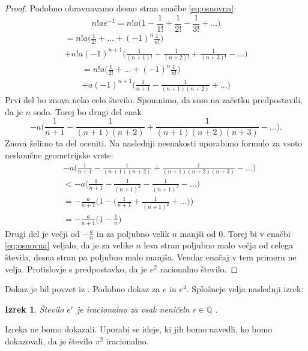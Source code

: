 \documentclass[a4paper]{article}
\makeatletter
\theoremstyle{plain}
\newtheorem{izrek}{Izrek}
\newcommand{\pina}[1]{\pi^{#1}}
\newcommand{\mathleft}{\@fleqntrue\@mathmargin0pt}
\newcommand{\mathcenter}{\@fleqnfalse}
\makeatother
\begin{document}
\begin{proof}
Podobno obravnavamo desno stran enačbe \eqref{eq:osnovna}:
\mathleft
\begin{equation*}
n!ae^{-1} = n!a \bigg(1-\frac{1}{1!}+\frac{1}{2!}-\frac{1}{3!}+\dots \bigg) 
\end{equation*}
\mathcenter
\begin{multline*}
=n!a \bigg(\frac{1}{2!}+\dots+(-1)^n\frac{1}{n!}\bigg)\\
+ n!a (-1)^{n+1} \bigg( \frac{1}{(n+1)!}-\frac{1}{(n+2)!}+\frac{1}{(n+3)!}-\dots\bigg)
\end{multline*}
\begin{multline*}
=n!a \bigg(\frac{1}{2!}+\dots+(-1)^n\frac{1}{n!}\bigg)\\
+ a(-1)^{n+1} \bigg( \frac{1}{n+1}-\frac{1}{(n+1)(n+2)}+\dots\bigg)
\end{multline*}
Prvi del bo znova neko celo število. Spomnimo, da smo na začetku predpostavili, da je $n$ sodo. Torej bo drugi del enak
\begin{equation*}
-a \bigg( \frac{1}{n+1}-\frac{1}{(n+1)(n+2)}+\frac{1}{(n+1)(n+2)(n+3)}-\dots\bigg).
\end{equation*}
Znova želimo ta del oceniti. Na naslednji neenakosti uporabimo formulo za vsoto neskončne geometrijske vrste:
\begin{align*}
& -a \bigg( \frac{1}{n+1}-\frac{1}{(n+1)(n+2)}+\frac{1}{(n+1)(n+2)(n+3)}-\dots\bigg) \\
&< -a \bigg( \frac{1}{n+1}-\frac{1}{(n+1)^2}-\frac{1}{(n+1)^3}-\dots\bigg) \\
&= - \frac{a}{n+1}\bigg(1 -\bigg(\frac{1}{n+1}+\frac{1}{(n+1)^2}+\dots\bigg)\bigg) \\
&= - \frac{a}{n+1}\bigg(1 - \frac{1}{n}\bigg)
\end{align*}
Drugi del je večji od $-\frac{a}{n}$ in za poljubno velik $n$ manjši od 0. Torej bi v enačbi \eqref{eq:osnovna} veljalo, da je za velike $n$ leva stran poljubno malo večja od celega števila, desna stran pa poljubno malo manjša. Vendar enačaj v tem primeru ne velja. Protislovje s predpostavko, da je $e^2$ racionalno število.
\end{proof}

Dokaz je bil povzet iz \cite{dokazi}. Podobno dokaz za $e$ in $e^4$. Splošneje velja naslednji izrek:

\begin{izrek}
Število $e^r$ je iracionalno za vsak neničeln $r\in\mathbb{Q}$ .
\end{izrek}

Izreka ne bomo dokazali. Uporabi se ideje, ki jih bomo navedli, ko bomo dokazovali, da je število $\pina{2}$ iracionalno. 
\end{document}
